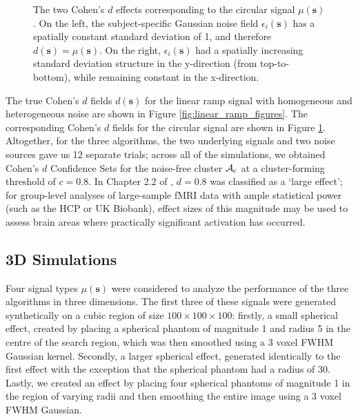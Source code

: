 \begin{figure}[htbp]
  \centering
  \hspace{1em}
  \caption{The two Cohen's $d$ effects corresponding to the circular signal $\mu(\bm{s})$. On the left, the subject-specific Gaussian noise field $\epsilon_{i}(\bm{s})$ has a spatially constant standard deviation of 1, and therefore $d(\bm{s}) = \mu(\bm{s})$. On the right, $\epsilon_{i}(\bm{s})$ had a spatially increasing standard deviation structure in the y-direction (from top-to-bottom), while remaining constant in the x-direction.} 
\label{fig:circle_figures}
\end{figure}

The true Cohen's $d$ fields $d(\bm{s})$ for the linear ramp signal with homogeneous and heterogeneous noise are shown in Figure \ref{fig:linear_ramp_figures}. The corresponding Cohen's $d$ fields for the circular signal are shown in Figure \ref{fig:circle_figures}. Altogether, for the three algorithms, the two underlying signals and two noise sources gave us 12 separate trials; across all of the simulations, we obtained Cohen's $d$ Confidence Sets for the noise-free cluster $\operatorname{\mathcal{A}_{c}}$ at a cluster-forming threshold of $c = 0.8$. In Chapter 2.2 of \citet*{Cohen2013-it}, $d=0.8$ was classified as a `large effect'; for group-level analyses of large-sample fMRI data with ample statistical power (such as the HCP or UK Biobank), effect sizes of this magnitude may be used to assess brain areas where practically significant  activation has occurred.



\subsection{3D Simulations}
Four signal types $\mu(\bm{s})$ were considered to analyze the performance of the three algorithms in three dimensions. The first three of these signals were generated synthetically on a cubic region of size $100 \times 100 \times 100$: firstly, a small spherical effect, created by placing a spherical phantom of magnitude 1 and radius 5 in the centre of the search region, which was then smoothed using a 3 voxel FWHM Gaussian kernel. Secondly, a larger spherical effect, generated identically to the first effect with the exception that the spherical phantom had a radius of 30. Lastly, we created an effect by placing four spherical phantoms of magnitude 1 in the region of varying radii and then smoothing the entire image using a 3 voxel FWHM Gaussian. 

